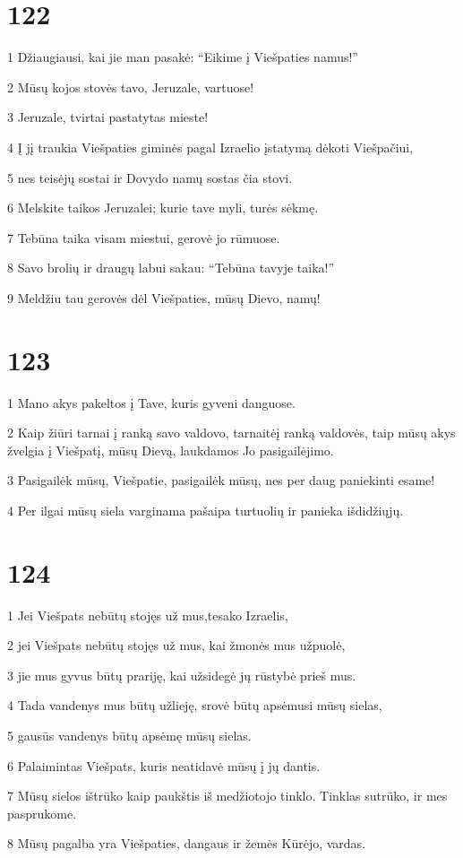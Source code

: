 \chapter{122}


\par 1 Džiaugiausi, kai jie man pasakė: “Eikime į Viešpaties namus!” 
\par 2 Mūsų kojos stovės tavo, Jeruzale, vartuose! 
\par 3 Jeruzale, tvirtai pastatytas mieste! 
\par 4 Į jį traukia Viešpaties giminės pagal Izraelio įstatymą dėkoti Viešpačiui, 
\par 5 nes teisėjų sostai ir Dovydo namų sostas čia stovi. 
\par 6 Melskite taikos Jeruzalei; kurie tave myli, turės sėkmę. 
\par 7 Tebūna taika visam miestui, gerovė jo rūmuose. 
\par 8 Savo brolių ir draugų labui sakau: “Tebūna tavyje taika!” 
\par 9 Meldžiu tau gerovės dėl Viešpaties, mūsų Dievo, namų!


\chapter{123}


\par 1 Mano akys pakeltos į Tave, kuris gyveni danguose. 
\par 2 Kaip žiūri tarnai į ranką savo valdovo, tarnaitė­į ranką valdovės, taip mūsų akys žvelgia į Viešpatį, mūsų Dievą, laukdamos Jo pasigailėjimo. 
\par 3 Pasigailėk mūsų, Viešpatie, pasigailėk mūsų, nes per daug paniekinti esame! 
\par 4 Per ilgai mūsų siela varginama pašaipa turtuolių ir panieka išdidžiųjų.


\chapter{124}


\par 1 Jei Viešpats nebūtų stojęs už mus,­tesako Izraelis,­ 
\par 2 jei Viešpats nebūtų stojęs už mus, kai žmonės mus užpuolė, 
\par 3 jie mus gyvus būtų prariję, kai užsidegė jų rūstybė prieš mus. 
\par 4 Tada vandenys mus būtų užlieję, srovė būtų apsėmusi mūsų sielas, 
\par 5 gausūs vandenys būtų apsėmę mūsų sielas. 
\par 6 Palaimintas Viešpats, kuris neatidavė mūsų į jų dantis. 
\par 7 Mūsų sielos ištrūko kaip paukštis iš medžiotojo tinklo. Tinklas sutrūko, ir mes pasprukome. 
\par 8 Mūsų pagalba yra Viešpaties, dangaus ir žemės Kūrėjo, vardas.


